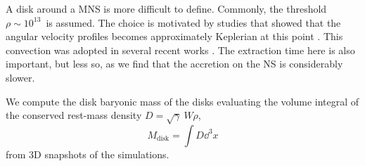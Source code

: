 A disk around a \ac{MNS} is more difficult to define. Commonly, the 
threshold $\rho\sim 10^{13}$~\gcm is assumed. The choice is motivated by studies that 
showed that the angular velocity profiles becomes approximately Keplerian at this point 
\citep[\eg][]{Shibata:2005ss,Shibata:2006nm,Hanauske:2016gia,Kastaun:2016elu}.
This convection was adopted in several recent works 
\citep{Radice:2018pdn,Kiuchi:2019lls,Vincent:2019kor}.
The extraction time here is also important, but less so, as we find that the accretion on the 
\ac{NS} is considerably slower.
%


We compute the disk baryonic mass of the disks evaluating
the volume integral of the conserved rest-mass density $D=\sqrt{\gamma}~W\rho$,
%
\begin{equation}
\label{eq:method:mdisk}
M_{\text{disk}} = \int D \dd^3 x
\end{equation}
%
from $3$D snapshots of the simulations.%




